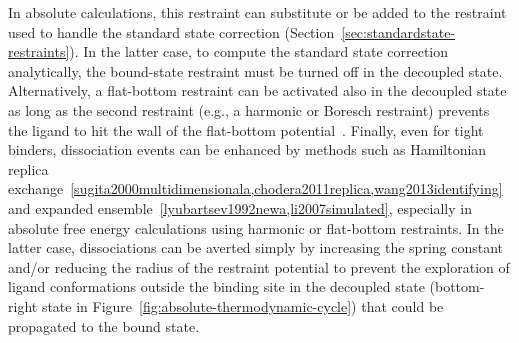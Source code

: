 \documentclass[9pt,bestpractices]{livecoms}
\begin{document}
In absolute calculations, this restraint can substitute or be added to the restraint used to handle the standard state correction (Section~\ref{sec:standardstate-restraints}).
In the latter case, to compute the standard state correction analytically, the bound-state restraint must be turned off in the decoupled state.
Alternatively, a flat-bottom restraint can be activated also in the decoupled state as long as the second restraint (e.g., a harmonic or Boresch restraint) prevents the ligand to hit the wall of the flat-bottom potential~\cite{rizzi2019sampl6}.
Finally, even for tight binders, dissociation events can be enhanced by methods such as Hamiltonian replica exchange~\ref{sugita2000multidimensionala,chodera2011replica,wang2013identifying} and expanded ensemble~\ref{lyubartsev1992newa,li2007simulated}, especially in absolute free energy calculations using harmonic or flat-bottom restraints.
In the latter case, dissociations can be averted simply by increasing the spring constant and/or reducing the radius of the restraint potential to prevent the exploration of ligand conformations outside the binding site in the decoupled state (bottom-right state in Figure~\ref{fig:absolute-thermodynamic-cycle}) that could be propagated to the bound state.
%
\end{document}
